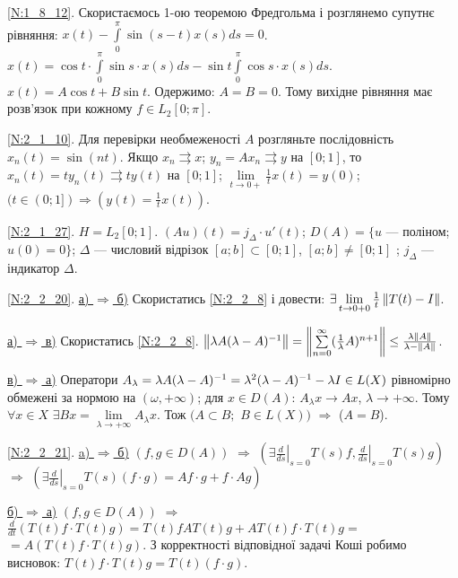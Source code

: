 \noindent\ref{N:1_8_12}. Скористаємось 1-ою теоремою Фредгольма і розглянемо супутнє рівняння: $x(t) - \int\limits_0^{\pi} \sin (s-t)x(s) ds = 0$.
$x(t) = \cos t \cdot \int\limits_0^{\pi} \sin s \cdot x(s) ds - \sin t \int\limits_0^{\pi} \cos s \cdot x(s) ds$. $x(t) = A \cos t + B \sin t$.
Одержимо: $A = B = 0$. Тому вихідне рівняння має розв'язок при кожному $f \in L_2 [0; \pi]$.

\noindent\ref{N:2_1_10}. Для перевірки необмеженості $A$ розгляньте послідовність $x_n (t) = \sin (nt)$.
Якщо $x_n \rightrightarrows x$; $y_n = A x_n \rightrightarrows y$ на $[0; 1]$, то $x_n (t) = t y_n(t) \rightrightarrows t y(t)$
на $[0; 1]$; $\lim\limits_{t \rightarrow 0+} \frac{1}{t} x(t) = y(0)$; $(t \in (0; 1]) \Rightarrow (y(t) = \frac{1}{t} x(t))$.

\noindent\ref{N:2_1_27}. $H = L_2 [0; 1]$. $(A u)(t) = j_{\Delta} \cdot u'(t)$; 
$D(A) = \{u$ --- поліном; $u(0) = 0\}$; $\Delta$ --- числовий відрізок $[a; b] \subset [0; 1]$, $[a; b] \neq [0; 1]$ ; $j_{\Delta}$ --- індикатор $\Delta$.

\noindent\ref{N:2_2_20}. \ul{а) $\Rightarrow$ б)} Скористатись \ref{N:2_2_8} і 
довести: $\exists \lim\limits_{t\rightarrow 0+0}\frac{1}{t}\left\lVert T(t) - I\right\rVert$.

\noindent \ul{а) $\Rightarrow$ в)} Скористатись \ref{N:2_2_8}. 
$\left\lVert\lambda A (\lambda - A)^{-1}\right\rVert = \left\lVert\sum\limits_{n=0}^\infty 
(\frac{1}{\lambda}A)^{n+1}\right\rVert \leq \frac{\lambda \left\lVert A\right\rVert}{\lambda - \left\lVert A\right\rVert}$.

\noindent \ul{в) $\Rightarrow$ а)} Оператори $A_\lambda = \lambda A (\lambda - A)^{-1} = 
\lambda^2 (\lambda - A)^{-1} - \lambda I \in L(X)$ рівномірно обмежені за 
нормою на $(\omega, +\infty)$; для $x \in D(A)$: $A_\lambda x \rightarrow 
Ax$, $\lambda \rightarrow +\infty$. Тому $\forall x \in X$ $\exists Bx 
= \lim\limits_{\lambda \rightarrow +\infty} A_\lambda x$. 
Тож $(A \subset B;$ $B \in L(X))$ $\Rightarrow$ ($A = B$).

\noindent\ref{N:2_2_21}. \ul{a) $\Rightarrow$ б)} $\left(f, g \in D(A)\right)$ 
$\Rightarrow$ $\left(\exists \left.\frac{d}{ds}\right|_{s=0}T(s)f, 
\left.\frac{d}{ds}\right|_{s=0}T(s)g\right)$ $\Rightarrow$ 
$(\exists \left.\frac{d}{ds}\right|_{s=0}T(s)(f\cdot g) = Af \cdot g + f \cdot Ag)$

\ul{б) $\Rightarrow$ а)} $(f, g\in D(A))$ $\Rightarrow$ $\frac{d}{dt}(T(t)f \cdot T(t)g) = 
T(t)f AT(t)g + AT(t)f\cdot T(t)g =$ $=A(T(t)f\cdot T(t)g)$.
З корректності відповідної задачі Коші робимо висновок:
$T(t)f \cdot T(t)g = T(t)(f \cdot g)$.

